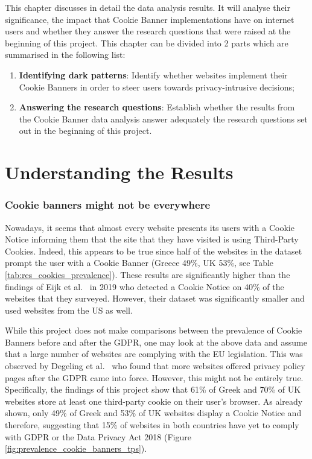 \documentclass[../main.tex]{subfiles}
\begin{document}
This chapter discusses in detail the data analysis results. It will analyse their significance, the impact that Cookie Banner implementations have on internet users and whether they answer the research questions that were raised at the beginning of this project. This chapter can be divided into 2 parts which are summarised in the following list: 

\begin{enumerate}
    \item \textbf{Identifying dark patterns}: Identify whether websites implement their Cookie Banners in order to steer users towards privacy-intrusive decisions; 
    \item \textbf{Answering the research questions}: Establish whether the results from the Cookie Banner data analysis answer adequately the research questions set out in the beginning of this project.
\end{enumerate}

\section{Understanding the Results}

\subsubsection{Cookie banners might not be everywhere}
Nowadays, it seems that almost every website presents its users with a Cookie Notice informing them that the site that they have visited is using Third-Party Cookies. Indeed, this appears to be true since half of the websites in the dataset prompt the user with a Cookie Banner (Greece 49\%, UK 53\%, see Table \ref{tab:res_cookies_prevalence}). These results are significantly higher than the findings of Eijk et al.~\cite{eijk2019impact} in 2019 who detected a Cookie Notice on 40\% of the websites that they surveyed. However, their dataset was significantly smaller and used websites from the US as well.

While this project does not make comparisons between the prevalence of Cookie Banners before and after the GDPR, one may look at the above data and assume that a large number of websites are complying with the EU legislation. This was observed by Degeling et al.~\cite{degeling2018we} who found that more websites offered privacy policy pages after the GDPR came into force. However, this might not be entirely true. Specifically, the findings of this project show that 61\% of Greek and 70\% of UK websites store at least one third-party cookie on their user’s browser. As already shown, only 49\% of Greek and 53\% of UK websites display a Cookie Notice and therefore, suggesting that 15\% of websites in both countries have yet to comply with GDPR or the Data Privacy Act 2018 (Figure \ref{fig:prevalence_cookie_banners_tps}).
\end{document}
